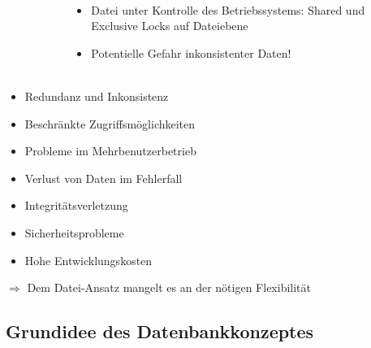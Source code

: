 \begin{frame}{\insertsection}
	\framesubtitle{\insertsubsection}
	\begin{columns}
		\begin{column}{.40\textwidth}
			\begin{figure}
			\end{figure}
		\end{column}
		\begin{column}{.56\textwidth}
			\begin{itemize}
				\item Datei unter Kontrolle des Betriebssystems: Shared und Exclusive Locks auf Dateiebene
				\item \alert{Potentielle Gefahr inkonsistenter Daten!}
			\end{itemize}
		\end{column}
	\end{columns}
\end{frame}

\begin{frame}{\insertsection}
	\framesubtitle{\insertsubsection}
	 \begin{itemize}
		\item Redundanz und Inkonsistenz
		\item Beschränkte Zugriffsmöglichkeiten
		\item Probleme im Mehrbenutzerbetrieb
		\item Verlust von Daten im Fehlerfall
		\item Integritätsverletzung
		\item Sicherheitsprobleme
		\item Hohe Entwicklungskosten
	\end{itemize}

	\alert{$\Rightarrow$ Dem Datei-Ansatz mangelt es an der nötigen Flexibilität}
\end{frame}

\subsection{Grundidee des Datenbankkonzeptes}

